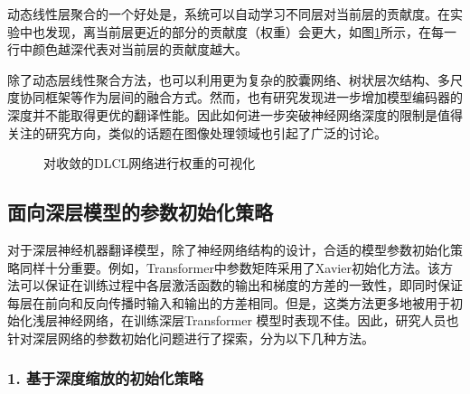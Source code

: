 \parinterval 动态线性层聚合的一个好处是，系统可以自动学习不同层对当前层的贡献度。在实验中也发现，离当前层更近的部分的贡献度（权重）会更大，如图\ref{fig:15-14}所示，在每一行中颜色越深代表对当前层的贡献度越大。

\parinterval 除了动态层线性聚合方法，也可以利用更为复杂的胶囊网络、树状层次结构、多尺度协同框架等作为层间的融合方式。然而，也有研究发现进一步增加模型编码器的深度并不能取得更优的翻译性能。因此如何进一步突破神经网络深度的限制是值得关注的研究方向，类似的话题在图像处理领域也引起了广泛的讨论。

\begin{figure}[htp]
\centering

\caption{对收敛的DLCL网络进行权重的可视化}
\label{fig:15-14}
\end{figure}


\subsection{面向深层模型的参数初始化策略}

\parinterval 对于深层神经机器翻译模型，除了神经网络结构的设计，合适的模型参数初始化策略同样十分重要。例如，Transformer中参数矩阵采用了Xavier初始化方法。该方法可以保证在训练过程中各层激活函数的输出和梯度的方差的一致性，即同时保证每层在前向和反向传播时输入和输出的方差相同。但是，这类方法更多地被用于初始化浅层神经网络，在训练深层Transformer 模型时表现不佳。因此，研究人员也针对深层网络的参数初始化问题进行了探索，分为以下几种方法。


\subsubsection{1. 基于深度缩放的初始化策略}

